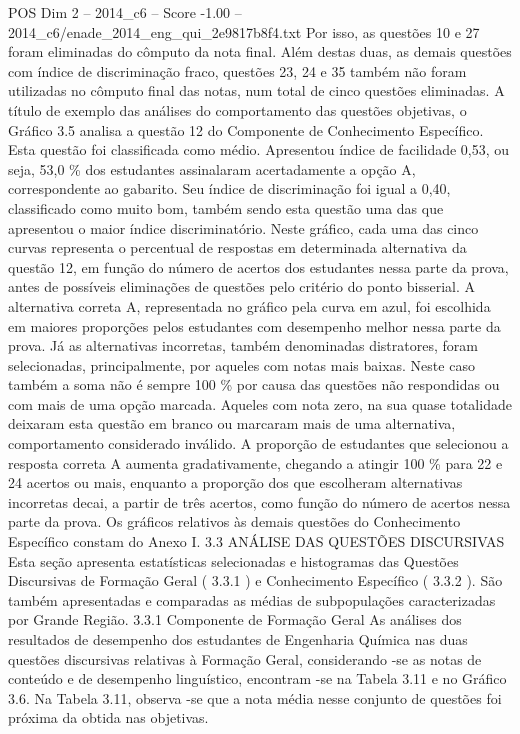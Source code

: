 \begin{textsample}{POS Dim 2 – 2014\_c6 – Score -1.00 – 2014\_c6/enade\_2014\_eng\_qui\_2e9817b8f4.txt}
Por isso, as questões 10 e 27 foram eliminadas do cômputo da nota final.
Além destas duas, as demais questões com índice de discriminação fraco, questões 23, 24 e 35 também não foram utilizadas no cômputo final das notas, num total de cinco questões eliminadas.
A título de exemplo das análises do comportamento das questões objetivas, o Gráfico 3.5 analisa a questão 12 do Componente de Conhecimento Específico.
Esta questão foi classificada como médio.
Apresentou índice de facilidade 0,53, ou seja, 53,0 \% dos estudantes assinalaram acertadamente a opção A, correspondente ao gabarito.
Seu índice de discriminação foi igual a 0,40, classificado como muito bom, também sendo esta questão uma das que apresentou o maior índice discriminatório.
Neste gráfico, cada uma das cinco curvas representa o percentual de respostas em determinada alternativa da questão 12, em função do número de acertos dos estudantes nessa parte da prova, antes de possíveis eliminações de questões pelo critério do ponto bisserial.
A alternativa correta A, representada no gráfico pela curva em azul, foi escolhida em maiores proporções pelos estudantes com desempenho melhor nessa parte da prova.
Já as alternativas incorretas, também denominadas distratores, foram selecionadas, principalmente, por aqueles com notas mais baixas.
Neste caso também a soma não é sempre 100 \% por causa das questões não respondidas ou com mais de uma opção marcada.
Aqueles com nota zero, na sua quase totalidade deixaram esta questão em branco ou marcaram mais de uma alternativa, comportamento considerado inválido.
A proporção de estudantes que selecionou a resposta correta A aumenta gradativamente, chegando a atingir 100 \% para 22 e 24 acertos ou mais, enquanto a proporção dos que escolheram alternativas incorretas decai, a partir de três acertos, como função do número de acertos nessa parte da prova.
Os gráficos relativos às demais questões do Conhecimento Específico constam do Anexo I. 3.3 ANÁLISE DAS QUESTÕES DISCURSIVAS Esta seção apresenta estatísticas selecionadas e histogramas das Questões Discursivas de Formação Geral ( 3.3.1 ) e Conhecimento Específico ( 3.3.2 ).
São também apresentadas e comparadas as médias de subpopulações caracterizadas por Grande Região. 3.3.1 Componente de Formação Geral As análises dos resultados de desempenho dos estudantes de Engenharia Química nas duas questões discursivas relativas à Formação Geral, considerando -se as notas de conteúdo e de desempenho linguístico, encontram -se na Tabela 3.11 e no Gráfico 3.6.
Na Tabela 3.11, observa -se que a nota média nesse conjunto de questões foi próxima da obtida nas objetivas.

\end{textsample}
